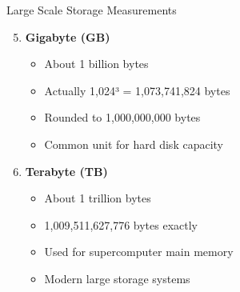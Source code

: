 \documentclass[aspectratio=169]{beamer}
\begin{document}
\begin{frame}{Large Scale Storage Measurements}
    \begin{enumerate}
        \setcounter{enumi}{4}
        \item \textbf{Gigabyte (GB)}
        \begin{itemize}
            \item About 1 billion bytes
            \item Actually 1,024³ = 1,073,741,824 bytes
            \item Rounded to 1,000,000,000 bytes
            \item Common unit for hard disk capacity
        \end{itemize}
        
        \item \textbf{Terabyte (TB)}
        \begin{itemize}
            \item About 1 trillion bytes
            \item 1,009,511,627,776 bytes exactly
            \item Used for supercomputer main memory
            \item Modern large storage systems
        \end{itemize}
    \end{enumerate}  
\end{frame}
\end{document}
